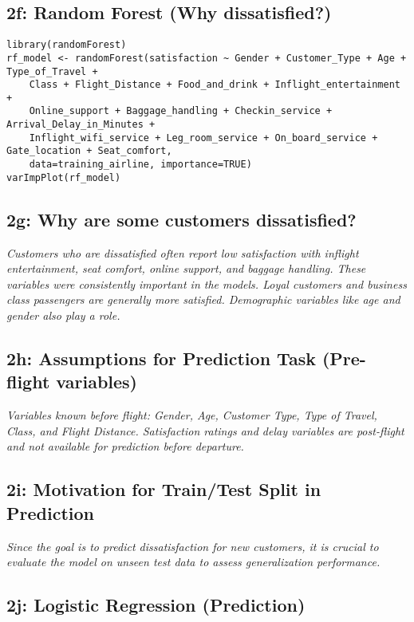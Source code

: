 \documentclass[12pt,a4paper]{article}
\begin{document}
\subsection{2f: Random Forest (Why dissatisfied?)}

\begin{lstlisting}[caption={2f: Random Forest - Inferential}]
library(randomForest)
rf_model <- randomForest(satisfaction ~ Gender + Customer_Type + Age + Type_of_Travel +
    Class + Flight_Distance + Food_and_drink + Inflight_entertainment +
    Online_support + Baggage_handling + Checkin_service + Arrival_Delay_in_Minutes +
    Inflight_wifi_service + Leg_room_service + On_board_service + Gate_location + Seat_comfort,
    data=training_airline, importance=TRUE)
varImpPlot(rf_model)
\end{lstlisting}

\subsection{2g: Why are some customers dissatisfied?}

\textit{Customers who are dissatisfied often report low satisfaction with inflight entertainment, seat comfort, online support, and baggage handling. These variables were consistently important in the models. Loyal customers and business class passengers are generally more satisfied. Demographic variables like age and gender also play a role.}

\subsection{2h: Assumptions for Prediction Task (Pre-flight variables)}

\textit{Variables known before flight: Gender, Age, Customer Type, Type of Travel, Class, and Flight Distance. Satisfaction ratings and delay variables are post-flight and not available for prediction before departure.}

\subsection{2i: Motivation for Train/Test Split in Prediction}

\textit{Since the goal is to predict dissatisfaction for new customers, it is crucial to evaluate the model on unseen test data to assess generalization performance.}

\subsection{2j: Logistic Regression (Prediction)}
\end{document}
